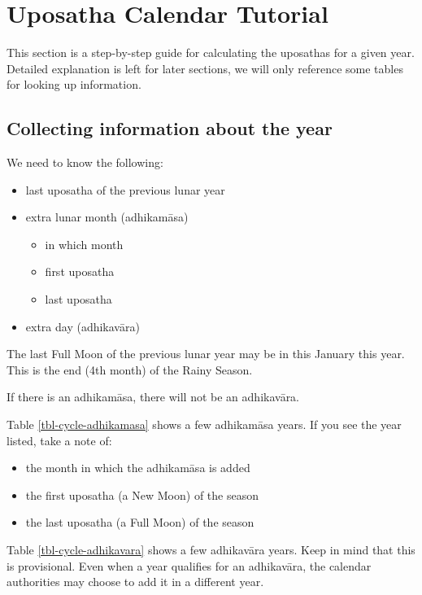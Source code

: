 \documentclass[11pt,oneside]{memoir-article}
\begin{document}
\clearpage

\chapter{Uposatha Calendar Tutorial}
\label{sec-1}

This section is a step-by-step guide for calculating the uposathas for a given
year. Detailed explanation is left for later sections, we will only reference
some tables for looking up information.

\section{Collecting information about the year}
\label{sec-1-1}

We need to know the following:

\begin{itemize}
\item last uposatha of the previous lunar year
\item extra lunar month (adhikamāsa)
\begin{itemize}
\item in which month
\item first uposatha
\item last uposatha
\end{itemize}
\item extra day (adhikavāra)
\end{itemize}

The last Full Moon of the previous lunar year may be in this January this year.
This is the end (4th month) of the Rainy Season.

If there is an adhikamāsa, there will not be an adhikavāra.

Table \ref{tbl-cycle-adhikamasa} shows a few adhikamāsa years. If you see the
year listed, take a note of:

\begin{itemize}
\item the month in which the adhikamāsa is added
\item the first uposatha (a New Moon) of the season
\item the last uposatha (a Full Moon) of the season
\end{itemize}

Table \ref{tbl-cycle-adhikavara} shows a few adhikavāra years. Keep in mind that
this is provisional. Even when a year qualifies for an adhikavāra, the calendar
authorities may choose to add it in a different year.
\end{document}
